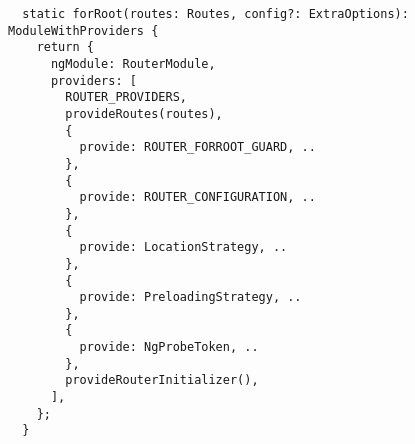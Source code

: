 \begin{verbatim}
  static forRoot(routes: Routes, config?: ExtraOptions): ModuleWithProviders {
    return {
      ngModule: RouterModule,
      providers: [
        ROUTER_PROVIDERS,
        provideRoutes(routes),
        {
          provide: ROUTER_FORROOT_GUARD, ..
        },
        {
          provide: ROUTER_CONFIGURATION, ..
        },
        {
          provide: LocationStrategy, ..
        },
        {
          provide: PreloadingStrategy, ..
        },
        {
          provide: NgProbeToken, ..
        },
        provideRouterInitializer(),
      ],
    };
  }
\end{verbatim}
